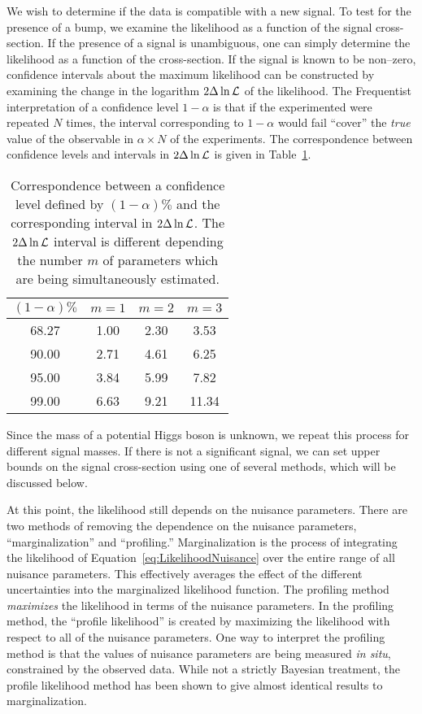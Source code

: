 We wish to determine if the data is compatible with a new signal.  To test for
the presence of a bump, we examine the likelihood as a function of the signal
cross-section.  If the presence of a signal is unambiguous, one can simply
determine the likelihood as a function of the cross-section.  If the signal is
known to be non--zero, confidence intervals about the maximum likelihood can be
constructed by examining the change in the logarithm $2\Delta \ln {\cal L}$ of
the likelihood.  The Frequentist  interpretation of a
confidence level $1-\alpha$ is that if the experimented were repeated $N$ times,
the interval corresponding to $1-\alpha$ would fail ``cover'' the \emph{true}
value of the observable in $\alpha \times N$ of the experiments.  The
correspondence between confidence levels and intervals in $2\Delta \ln {\cal L}$
is given in Table~\ref{tab:ConfidenceIntervals}.
\begin{table}
  \begin{center}
    \begin{tabular}{c|ccc} 
      $(1-\alpha)\%$ & $m = 1$ & $m = 2$ & $m = 3$ \\
      \hline
      68.27 & 1.00 & 2.30 & 3.53 \\
      90.00 & 2.71 & 4.61 & 6.25 \\
      95.00 & 3.84 & 5.99 & 7.82 \\
      99.00 & 6.63 & 9.21 & 11.34 \\
    \end{tabular}
    \caption[Correspondence of confidence levels and $2\Delta \ln {\cal L}$
    intervals]{Correspondence between a confidence level defined by
    $(1-\alpha)\%$ and the corresponding interval in $2\Delta \ln {\cal L}$.
    The $2\Delta \ln {\cal L}$ interval is different depending the number $m$ of
    parameters which are being simultaneously estimated.}
    \label{tab:ConfidenceIntervals}
  \end{center}
\end{table}
Since the mass of a potential Higgs boson is
unknown, we repeat this process for different signal masses.  If there is not a
significant signal, we can set upper bounds on the signal cross-section using
one of several methods, which will be discussed below.

At this point, the likelihood still depends on the nuisance parameters.  There
are two methods of removing the dependence on the nuisance parameters,
``marginalization'' and ``profiling.'' Marginalization is the process of
integrating the likelihood of Equation~\ref{eq:LikelihoodNuisance} over the
entire range of all nuisance parameters.  This effectively averages the effect
of the different uncertainties into the marginalized likelihood function.  The
profiling method \emph{maximizes} the likelihood in terms of the nuisance
parameters.  In the profiling method, the ``profile likelihood'' is created by
maximizing the likelihood with respect to all of the nuisance parameters.  One
way to interpret the profiling method is that the values of nuisance parameters
are being measured \emph{in situ}, constrained by the observed data.  While not
a strictly Bayesian treatment, the profile likelihood method has been shown to
give almost identical results to marginalization.

